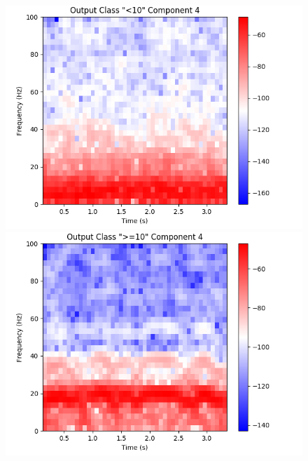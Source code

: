 \documentclass[fleqn,10pt]{wlscirep}
\begin{document}
\begin{figure}[t!]
  \begin{minipage}{0.24\textwidth}
    \includegraphics[width=\linewidth]{max_act/artificial_spec_4_0.png}
    \subcaption{}
  \end{minipage}
  \hspace*{\fill} 
  \begin{minipage}{0.24\textwidth}
    \includegraphics[width=\linewidth]{max_act/artificial_spec_4_1.png}
    \subcaption{}
  \end{minipage}
  \begin{minipage}{0.24\textwidth}

\end{minipage}
\end{figure}
\end{document}
